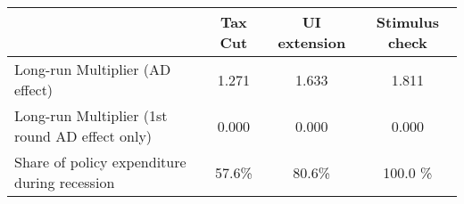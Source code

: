 \begin{tabular}{@{}lccc@{}}
\toprule
& Tax Cut    & UI extension    & Stimulus check    \\  \midrule
Long-run Multiplier (AD effect) &1.271  & 1.633  & 1.811     \\
Long-run Multiplier (1st round AD effect only) &0.000  & 0.000  & 0.000     \\
Share of policy expenditure during recession &57.6\%  & 80.6\%  & 100.0 \%    \\
\end{tabular}
